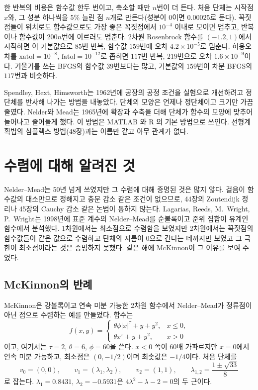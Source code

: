 한 반복의 비용은 함수값 한두 번이고, 축소할 때만 $n$번이 더 든다. 처음 단체는 시작점 $x$와, 그 성분 하나씩을 $5\%$ 늘린 점 $n$개로 만든다(성분이 $0$이면 $0.00025$로 둔다). 꼭짓점들이 위치로도 함수값으로도 가장 좋은 꼭짓점에서 $10^{-4}$ 이내로 모이면 멈추고, 반복이나 함수값이 $200n$번에 이르러도 멈춘다. 2차원 Rosenbrock 함수를 $(-1.2,1)$에서 시작하면 이 기본값으로 $85$번 반복, 함수값 $159$번에 오차 $4.2\times10^{-5}$로 멈춘다. 허용오차를 $\mathrm{xatol}=10^{-8}$, $\mathrm{fatol}=10^{-12}$로 좁히면 $117$번 반복, $219$번으로 오차 $1.6\times10^{-9}$이다. 기울기를 쓰는 BFGS의 함수값 $39$번보다는 많고, 기본값의 $159$번이 차분 BFGS의 $117$번과 비슷하다.

\begin{aside}[단체 방법의 두 갈래]
Spendley, Hext, Himsworth는 1962년에 공장의 공정 조건을 실험으로 개선하려고 정단체를 반사해 나가는 방법을 내놓았다\cite{spendley1962}. 단체의 모양은 언제나 정단체이고 크기만 가끔 줄였다. Nelder와 Mead는 1965년에 확장과 수축을 더해 단체가 함수의 모양에 맞추어 늘어나고 줄어들게 했다\cite{nelder1965}. 이 방법은 MATLAB 와 R 의 기본 방법으로 쓰인다. 선형계획법의 심플렉스 방법(48장)과는 이름만 같고 아무 관계가 없다.
\end{aside}

\section{수렴에 대해 알려진 것}
\label{sec:nm-theory}

Nelder--Mead는 50년 넘게 쓰였지만 그 수렴에 대해 증명된 것은 많지 않다. 걸음이 함수값의 대소만으로 정해지고 충분 감소 같은 조건이 없으므로, 44장의 Zoutendijk 정리나 45장의 Cauchy 감소 같은 논법이 통하지 않는다. Lagarias, Reeds, M.\ Wright, P.\ Wright는 1998년에 표준 계수의 Nelder--Mead를 순볼록이고 준위 집합이 유계인 함수에서 분석했다\cite{lagarias1998}. 1차원에서는 최소점으로 수렴함을 보였지만 2차원에서는 꼭짓점의 함수값들이 같은 값으로 수렴하고 단체의 지름이 $0$으로 간다는 데까지만 보였고 그 극한이 최소점이라는 것은 증명하지 못했다. 같은 해에 McKinnon이 그 이유를 보여 주었다.

\subsection{McKinnon의 반례}

McKinnon은 강볼록이고 연속 미분 가능한 2차원 함수에서 Nelder--Mead가 정류점이 아닌 점으로 수렴하는 예를 만들었다\cite{mckinnon1998}. 함수는
\[
f(x,y)=\begin{cases}\theta\phi|x|^\tau+y+y^2,&x\le0,\\\theta x^\tau+y+y^2,&x>0\end{cases}
\]
이고, 여기서는 $\tau=2$, $\theta=6$, $\phi=60$을 쓴다. $x<0$ 쪽이 $60$배 가파르지만 $x=0$에서 연속 미분 가능하고, 최소점은 $(0,-1/2)$이며 최솟값은 $-1/4$이다. 처음 단체를
\[
v_0=(0,0),\qquad v_1=(\lambda_1,\lambda_2),\qquad v_2=(1,1),\qquad\lambda_{1,2}=\frac{1\pm\sqrt{33}}8
\]
로 잡는다. $\lambda_1=0.8431$, $\lambda_2=-0.5931$은 $4\lambda^2-\lambda-2=0$의 두 근이다.

